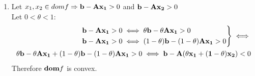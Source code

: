\documentclass[12pt]{article}
\begin{document}
\begin{enumerate}
\begin{itemize}
		\begin{enumerate}
			\item 
			Let $x_1,x_2\in {dom}f \Rightarrow {\bf b}-{\bf Ax_1}>0$ and ${\bf b}-{\bf Ax_2}>0$ \\
			Let $0<\theta<1$:
			\begin{equation}
				\begin{split}
					\begin{rcases}
						{\bf b}-{\bf A}{\bf x_1}>0 \iff \theta{\bf b}-\theta{\bf A}{\bf x_1}>0 \\
						{\bf b}-{\bf A}{\bf x_1}>0 \iff (1-\theta){\bf b}-(1-\theta){\bf A}{\bf x_1}>0
					\end{rcases}\iff \\
				 	\theta{\bf b}-\theta{\bf A}{\bf x_1}+(1-\theta){\bf b}-(1-\theta){\bf A}{\bf x_1}>0 \iff {\bf b}-{\bf A}(\theta{\bf x_1+(1-\theta){\bf x_2}})<0
				\end{split}
			\end{equation}
			Therefore ${\bf dom}f$ is convex.
			

\end{enumerate}
\end{itemize}
\end{enumerate}
\end{document}

